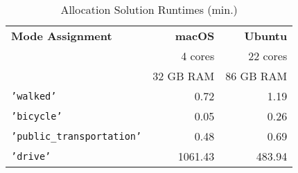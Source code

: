 \begin{table}[htb]
\caption{Allocation Solution Runtimes (min.)}
\label{tab:allocation_solution_runtime}
\small
\vspace{-6pt}
\begin{center}
\begin{tabular}{lrr}
\toprule
\bf Mode Assignment & \bf macOS     & \bf Ubuntu \\
                    & 4 cores       & 22 cores \\
                    & 32 GB RAM     & 86 GB RAM \\
\midrule
\texttt{'walked'}                   &       0.72    &   1.19    \\
\texttt{'bicycle'}                  &       0.05    &   0.26    \\
\texttt{'public\_transportation'}   &       0.48    &   0.69    \\
\texttt{'drive'}                    &    1061.43    & 483.94    \\
\bottomrule
\end{tabular}
\end{center}
\end{table}